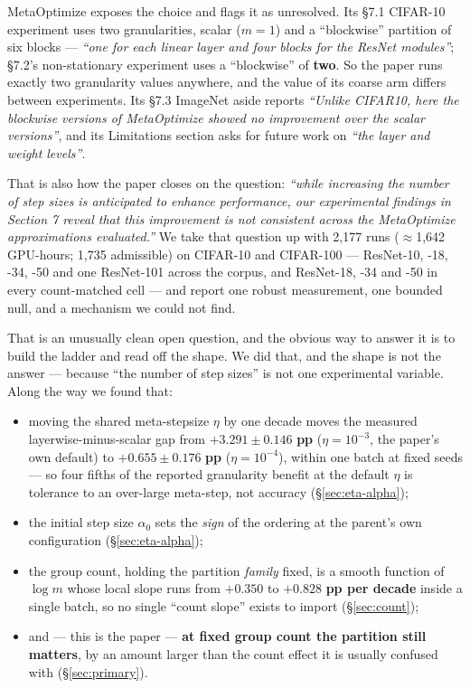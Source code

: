 \documentclass[10pt,letterpaper]{article}
\begin{document}
MetaOptimize exposes the choice and flags it as unresolved. Its \S7.1 CIFAR-10 experiment uses
two granularities, scalar ($m = 1$) and a ``blockwise'' partition of six blocks --- \emph{``one
for each linear layer and four blocks for the ResNet modules''}; \S7.2's non-stationary
experiment uses a ``blockwise'' of \textbf{two}. So the paper runs exactly two granularity
values anywhere, and the value of its coarse arm differs between experiments. Its \S7.3
ImageNet aside reports \emph{``Unlike CIFAR10, here the blockwise versions of MetaOptimize
showed no improvement over the scalar versions''}, and its Limitations section asks for future
work on \emph{``the layer and weight levels''}.

That is also how the paper closes on the question: \emph{``while increasing the number of step
sizes is anticipated to enhance performance, our experimental findings in Section 7 reveal that
this improvement is not consistent across the MetaOptimize approximations evaluated.''} We take
that question up with 2{,}177 runs ($\approx$1{,}642 GPU-hours; 1{,}735 admissible) on CIFAR-10
and CIFAR-100 --- ResNet-10, -18, -34, -50 and one ResNet-101 across the corpus, and ResNet-18, -34 and -50 in
every count-matched cell --- and report one robust measurement, one bounded null, and a
mechanism we could not find.

That is an unusually clean open question, and the obvious way to answer it is to build the
ladder and read off the shape. We did that, and the shape is not the answer --- because ``the
number of step sizes'' is not one experimental variable. Along the way we found that:

\begin{itemize}
\item moving the shared meta-stepsize $\eta$ by one decade moves the measured
  layerwise-minus-scalar gap from $\mathbf{+3.291 \pm 0.146}$ \textbf{pp} ($\eta = 10^{-3}$,
  the paper's own default) to $\mathbf{+0.655 \pm 0.176}$ \textbf{pp} ($\eta = 10^{-4}$),
  within one batch at fixed seeds --- so four fifths of the reported granularity benefit at
  the default $\eta$ is tolerance to an over-large meta-step, not accuracy
  (\S\ref{sec:eta-alpha});
\item the initial step size $\alpha_0$ sets the \emph{sign} of the ordering at the parent's
  own configuration (\S\ref{sec:eta-alpha});
\item the group count, holding the partition \emph{family} fixed, is a smooth function of
  $\log m$ whose local slope runs from $\mathbf{+0.350}$ to $\mathbf{+0.828}$ \textbf{pp per
  decade} inside a single batch, so no single ``count slope'' exists to import
  (\S\ref{sec:count});
\item and --- this is the paper --- \textbf{at fixed group count the partition still matters},
  by an amount larger than the count effect it is usually confused with
  (\S\ref{sec:primary}).
\end{itemize}
\end{document}
